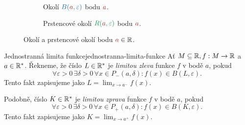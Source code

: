 \begin{figure}[ht]
 \centering
 \begin{subfigure}[b]{.49\textwidth}
  \centering
  \caption{Okolí $\clb{B(\clr{a},\varepsilon)}$ bodu $\clr{a}$.}
  \label{subfig:okoli-a-prstencove-okoli-bodu-1}
 \end{subfigure}
 \begin{subfigure}[b]{.49\textwidth}
  \centering
  \caption{Prstencové okolí $\clg{R(\clr{a},\varepsilon)}$ bodu $\clr{a}$.}
  \label{subfig:okoli-a-prstencove-okoli-bodu-2}
 \end{subfigure}
 \caption{Okolí a prstencové okolí bodu $\clr{a} \in \R$.}
 \label{fig:okoli-a-prstencove-okoli-bodu}
\end{figure}

\begin{definition}{Jednostranná limita funkce}{jednostranna-limita-funkce}
 Ať $M \subseteq \mathbb{R}, f:M \to \mathbb{R}$ a $a \in \mathbb{R}^*$. Řekneme, že číslo $L \in \mathbb{R}^*$
 je \emph{limitou zleva} funkce $f$ v bodě $a$, pokud
 \[
 \forall \varepsilon>0 \, \exists \delta>0 \, \forall x \in P_{-}(a,\delta):
 f(x) \in B(L,\varepsilon).
 \]
 Tento fakt zapisujeme jako $L = \lim_{x \to a^{-}} f(x)$.

 Podobně, číslo $K \in \mathbb{R}^{*}$ je \emph{limitou zprava} funkce $f$ v bodě $a$,
 pokud
 \[
 \forall \varepsilon>0 \, \exists \delta>0 \, \forall x \in P_{+}(a,\delta):
 f(x) \in B(K,\varepsilon).
 \]
 Tento fakt zapisujeme jako $K = \lim_{x \to a^{+}} f(x)$.
\end{definition}

